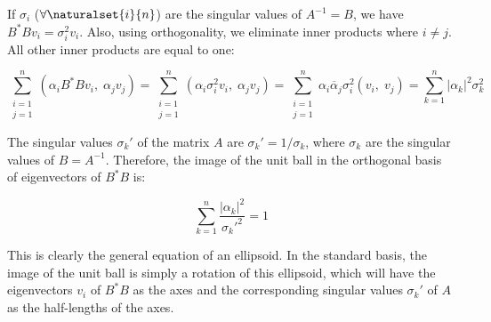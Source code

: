 If $\sigma_i$ ($\forall \naturalset{i}{n}$) are the singular values of $A^{-1}=B$, we have $B^*Bv_i=\sigma_i^2v_i$. Also, using orthogonality, we eliminate inner products where $i\neq j$. All other inner products are equal to one:

$$\sum_{\substack{i=1\\j=1}}^n(\alpha_i B^*Bv_i,\;\alpha_j v_j)=\sum_{\substack{i=1\\j=1}}^n(\alpha_i \sigma_i^2v_i,\;\alpha_j v_j)=\sum_{\substack{i=1\\j=1}}^n\alpha_i \overline{\alpha}_j \sigma_i^2(v_i,\;v_j)=\sum_{k=1}^n|\alpha_k|^2 \sigma_k^2$$

The singular values $\sigma_k'$ of the matrix $A$ are $\sigma_k'={1}/{\sigma_k}$, where $\sigma_k$ are the singular values of $B=A^{-1}$. Therefore, the image of the unit ball in the orthogonal basis of eigenvectors of $B^*B$ is:

$$\sum_{k=1}^n \frac{|\alpha_k|^2}{{\sigma_k'}^2}=1$$

This is clearly the general equation of an ellipsoid. In the standard basis, the image of the unit ball is simply a rotation of this ellipsoid, which will have the eigenvectors $v_i$ of $B^*B$ as the axes
and the corresponding singular values $\sigma_k'$ of $A$ as the half-lengths of the axes.